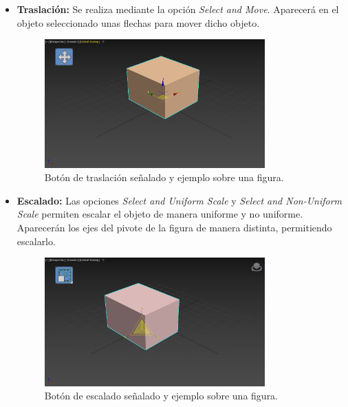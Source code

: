 \documentclass{article}
\begin{document}
\begin{itemize}
    \item \textbf{Traslación: }Se realiza mediante la opción \textit{Select and Move}. Aparecerá en el objeto seleccionado unas flechas para mover dicho objeto.
    
    \begin{figure}[H]
        \centering
        \includegraphics[width=0.8\textwidth]{imagenes/trans.jpg}
        \caption{Botón de traslación señalado y ejemplo sobre una figura.}
     \end{figure}


     \newpage

    \item \textbf{Escalado: }Las opciones \textit{Select and Uniform Scale} y \textit{Select and Non-Uniform Scale} permiten escalar el objeto de manera uniforme y no uniforme. Aparecerán los ejes del pivote de la figura de manera distinta, permitiendo escalarlo.
    
    \begin{figure}[H]
        \centering
        \includegraphics[width=0.8\textwidth]{imagenes/scale.jpg}
        \caption{Botón de escalado señalado y ejemplo sobre una figura.}
     \end{figure}



\end{itemize}
\end{document}

